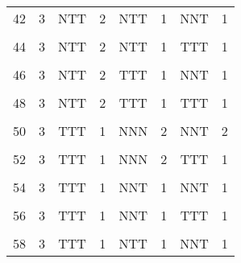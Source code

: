 \begin{table}[H]
{\begin{tabular}[t]{cccccccc}
			42 & 3 & NTT & 2 & NTT & 1 & NNT & 1\\
			\cellcolor{gray!6}{43} & \cellcolor{gray!6}{3} & \cellcolor{gray!6}{NTT} & \cellcolor{gray!6}{2} & \cellcolor{gray!6}{NTT} & \cellcolor{gray!6}{1} & \cellcolor{gray!6}{NTT} & \cellcolor{gray!6}{1}\\
			44 & 3 & NTT & 2 & NTT & 1 & TTT & 1\\
			\cellcolor{gray!6}{45} & \cellcolor{gray!6}{3} & \cellcolor{gray!6}{NTT} & \cellcolor{gray!6}{2} & \cellcolor{gray!6}{TTT} & \cellcolor{gray!6}{1} & \cellcolor{gray!6}{NNN} & \cellcolor{gray!6}{1}\\
			46 & 3 & NTT & 2 & TTT & 1 & NNT & 1\\
			\cellcolor{gray!6}{47} & \cellcolor{gray!6}{3} & \cellcolor{gray!6}{NTT} & \cellcolor{gray!6}{2} & \cellcolor{gray!6}{TTT} & \cellcolor{gray!6}{1} & \cellcolor{gray!6}{NTT} & \cellcolor{gray!6}{1}\\
			48 & 3 & NTT & 2 & TTT & 1 & TTT & 1\\
			\cellcolor{gray!6}{49} & \cellcolor{gray!6}{3} & \cellcolor{gray!6}{TTT} & \cellcolor{gray!6}{1} & \cellcolor{gray!6}{NNN} & \cellcolor{gray!6}{2} & \cellcolor{gray!6}{NNN} & \cellcolor{gray!6}{2}\\
			50 & 3 & TTT & 1 & NNN & 2 & NNT & 2\\
			\cellcolor{gray!6}{51} & \cellcolor{gray!6}{3} & \cellcolor{gray!6}{TTT} & \cellcolor{gray!6}{1} & \cellcolor{gray!6}{NNN} & \cellcolor{gray!6}{2} & \cellcolor{gray!6}{NTT} & \cellcolor{gray!6}{1}\\
			52 & 3 & TTT & 1 & NNN & 2 & TTT & 1\\
			\cellcolor{gray!6}{53} & \cellcolor{gray!6}{3} & \cellcolor{gray!6}{TTT} & \cellcolor{gray!6}{1} & \cellcolor{gray!6}{NNT} & \cellcolor{gray!6}{1} & \cellcolor{gray!6}{NNN} & \cellcolor{gray!6}{2}\\
			54 & 3 & TTT & 1 & NNT & 1 & NNT & 1\\
			\cellcolor{gray!6}{55} & \cellcolor{gray!6}{3} & \cellcolor{gray!6}{TTT} & \cellcolor{gray!6}{1} & \cellcolor{gray!6}{NNT} & \cellcolor{gray!6}{1} & \cellcolor{gray!6}{NTT} & \cellcolor{gray!6}{1}\\
			56 & 3 & TTT & 1 & NNT & 1 & TTT & 1\\
			\cellcolor{gray!6}{57} & \cellcolor{gray!6}{3} & \cellcolor{gray!6}{TTT} & \cellcolor{gray!6}{1} & \cellcolor{gray!6}{NTT} & \cellcolor{gray!6}{1} & \cellcolor{gray!6}{NNN} & \cellcolor{gray!6}{1}\\
			58 & 3 & TTT & 1 & NTT & 1 & NNT & 1\\

\end{tabular}}
\end{table}
